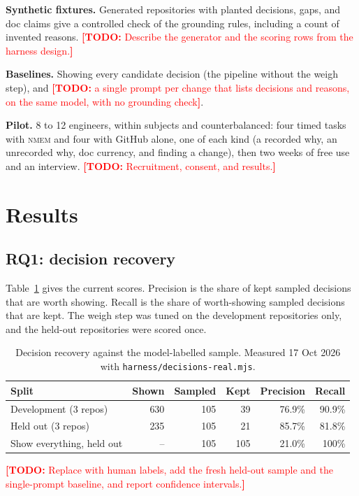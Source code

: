 \documentclass[acmsmall,screen,review]{acmart}
\newcommand{\todo}[1]{\textcolor{red}{\textbf{[TODO:} #1\textbf{]}}}
\newcommand{\prov}[1]{\textcolor{orange!85!black}{#1}}
\newcommand{\nmem}{\textsc{nmem}}
\begin{document}
\textbf{Synthetic fixtures.} Generated repositories with planted decisions, gaps, and doc claims give a controlled
check of the grounding rules, including a count of invented reasons. \todo{Describe the generator and the scoring
rows from the harness design.}

\textbf{Baselines.} Showing every candidate decision (the pipeline without the weigh step), and \todo{a single prompt per
change that lists decisions and reasons, on the same model, with no grounding check}.

\textbf{Pilot.} 8 to 12 engineers, within subjects and counterbalanced: four timed tasks with \nmem{} and four with
GitHub alone, one of each kind (a recorded why, an unrecorded why, doc currency, and finding a change), then two weeks
of free use and an interview. \todo{Recruitment, consent, and results.}

\section{Results}
\label{sec:results}

\subsection{RQ1: decision recovery}
Table~\ref{tab:rq1} gives the current scores. Precision is the share of kept sampled decisions that are worth showing.
Recall is the share of worth-showing sampled decisions that are kept. The weigh step was tuned on the development
repositories only, and the held-out repositories were scored once.

\begin{table}[t]
\caption{Decision recovery against the \prov{model-labelled} sample. Measured 17 Oct 2026 with
\texttt{harness/decisions-real.mjs}.}
\label{tab:rq1}
\small
\begin{tabular}{@{}lrrrrr@{}}
\toprule
Split & Shown & Sampled & Kept & Precision & Recall \\
\midrule
Development (3 repos) & 630 & 105 & 39 & \prov{76.9\%} & \prov{90.9\%} \\
Held out (3 repos) & 235 & 105 & 21 & \prov{85.7\%} & \prov{81.8\%} \\
\midrule
Show everything, held out & -- & 105 & 105 & \prov{21.0\%} & 100\% \\
\bottomrule
\end{tabular}
\end{table}

\todo{Replace with human labels, add the fresh held-out sample and the single-prompt baseline, and report
confidence intervals.}
\end{document}
